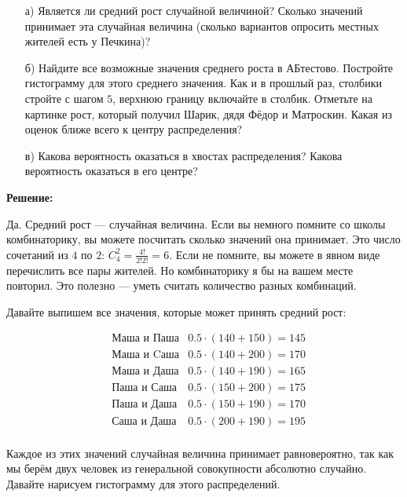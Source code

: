 \documentclass[12pt, a4paper, oneside]{article}
\begin{document}
\begin{enumerate} 
	\item[а)] Является ли средний рост случайной величиной? Сколько значений принимает эта случайная величина (сколько вариантов опросить местных жителей есть у Печкина)?
	\item[б)] Найдите все возможные значения среднего роста в АБтестово. Постройте гистограмму для этого среднего значения. Как и в прошлый раз, столбики стройте с шагом $5$, верхнюю границу включайте в столбик. Отметьте на картинке рост, который получил Шарик, дядя Фёдор и Матроскин. Какая из оценок ближе всего к центру распределения? 
	\item[в)] Какова вероятность оказаться в хвостах распределения? Какова вероятность оказаться в его центре? 
\end{enumerate} 

\textbf{Решение:} 

Да. Средний рост --- случайная величина. Если вы немного помните со школы комбинаторику, вы можете посчитать сколько значений она принимает. Это число сочетаний из $4$ по $2$:  $C_4^2 = \frac{4!}{2!2!} =  6$. Если не помните, вы можете в явном виде перечислить все пары жителей. Но комбинаторику я бы на вашем месте повторил. Это полезно --- уметь считать количество разных комбинаций.  

Давайте выпишем все значения, которые может принять средний рост: 

\begin{equation*}
\begin{aligned}
& \text{Маша и Паша}  & 0.5 \cdot (140 + 150) = 145 \\
& \text{Маша и Cаша}  & 0.5 \cdot (140 + 200) = 170 \\
& \text{Маша и Даша}  & 0.5 \cdot (140 + 190) = 165 \\
& \text{Паша и Саша}  & 0.5 \cdot (150 + 200) = 175 \\
& \text{Паша и Даша}  & 0.5 \cdot (150 + 190) =  170 \\
& \text{Саша и Даша}  & 0.5 \cdot (200 + 190) =  195 \\
\end{aligned} 
\end{equation*}

Каждое из этих значений случайная величина принимает равновероятно, так как мы берём двух человек из генеральной совокупности абсолютно случайно.  Давайте нарисуем гистограмму для этого распределений. 
\end{document}
